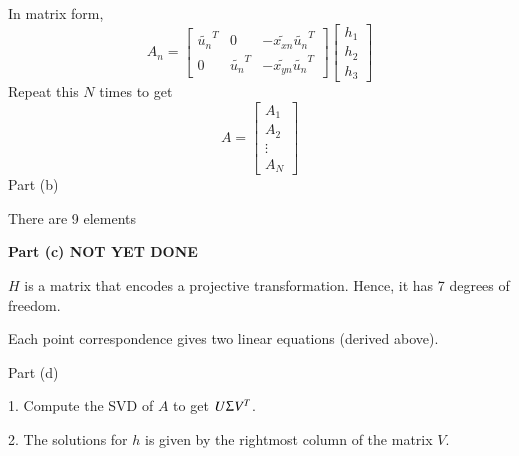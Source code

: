 \documentclass{scrbook}
\begin{document}
In matrix form,
\begin{equation*}
A_{n}=\left[\begin{array}{ccc}
\widetilde{u_{n}}^{T} & 0 & -\widetilde{x_{xn}}\widetilde{u_{n}}^{T}\\
0 & \widetilde{u_{n}}^{T} & -\widetilde{x_{yn}}\widetilde{u_{n}}^{T}
\end{array}\right]\left[\begin{array}{c}
h_{1}\\
h_{2}\\
h_{3}
\end{array}\right]
\end{equation*}
Repeat this $N$ times to get
\begin{equation*}
A=\left[\begin{array}{c}
A_{1}\\
A_{2}\\
\vdots \\
A_{N}
\end{array}\right]
\end{equation*}
Part (b)

There are 9 elements

\textbf{Part (c) NOT YET DONE}

$H$ is a matrix that encodes a projective transformation. Hence, it has 7 degrees of freedom.

Each point correspondence gives two linear equations (derived above).

Part (d)

1. Compute the SVD of $A$ to get $U\Upsigma V^{T}$.

2. The solutions for $h$ is given by the rightmost column of the matrix $V$.
\end{document}
